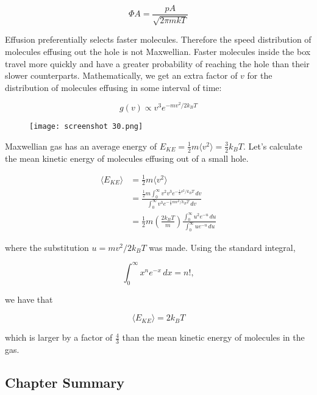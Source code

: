 \documentclass[svgnames]{article}     %
\begin{document}
\[
  \Phi A = \frac{pA}{\sqrt{2\pi m kT}}
\] \vspace{5px}

Effusion preferentially selects faster molecules. Therefore the speed
distribution of molecules effusing out the hole is not Maxwellian. Faster
molecules inside the box travel more quickly and have a greater probability of
reaching the hole than their slower counterparts. Mathematically, we get an
extra factor of $v$ for the distribution of molecules effusing in some interval
of time: 

\[g(v) \propto v^3e^{-mv^2 / 2k_B T}\] \vspace{5px}


\begin{figure}[H]
  \centering
    \texttt{[image: screenshot 30.png]}
\end{figure}


Maxwellian gas has an average energy of $E_{KE} = \frac{1}{2}m\langle v^2
\rangle = \frac{3}{2}k_B T$. Let's calculate the mean kinetic energy of
molecules effusing out of a small hole. 

\begin{align*}
  \langle E_{KE} \rangle &= \frac{1}{2}m\langle v^2 \rangle \\
                         &= \frac{\frac{1}{2}m \int_{0}^{\infty} v^2 v^3
                         e^{-\frac{1}{2}v^2 / k_B T} \, dv}{\int_{0}^{\infty}
                       v^3 e^{-\frac{1}{2} mv^2 / k_B T} \, dv} \\
                         &= \frac{1}{2}m \left( \frac{2k_B T}{m} \right)
                         \frac{\int_{0}^{\infty} u^2 e^{-u} \,
                         du}{\int_{0}^{\infty} ue^{-u} \, du} 
\end{align*}

where the substitution $u = mv^2 / 2k_B T$ was made. Using the standard
integral, 

\[
  \int_{0}^{\infty} x^n e^{-x} \, dx = n!,
\] \vspace{5px}

we have that 

\[
  \langle E_{KE} \rangle = 2k_B T
\] \vspace{5px}

which is larger by a factor of $\frac{4}{3}$ than the mean kinetic energy of
molecules in the gas.

\subsection{Chapter Summary}
\end{document}
